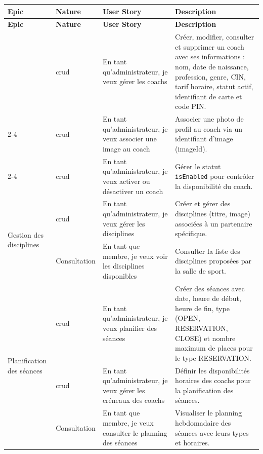 ﻿\documentclass[../main.tex]{subfiles}
\begin{document}
\begin{longtable}{|p{2.5cm}|p{2cm}|p{4cm}|p{5.5cm}|}
\hline
\textbf{Epic} & \textbf{Nature} & \textbf{User Story} & \textbf{Description} \\
\hline
\endfirsthead
\hline
\textbf{Epic} & \textbf{Nature} & \textbf{User Story} & \textbf{Description} \\
\hline
\endhead
\hline
\endfoot

\multirow{3}{*}{\parbox{2.5cm}{Gestion des coachs}} & \acrshort{crud} & En tant qu'administrateur, je veux g\'{e}rer les coachs & Cr\'{e}er, modifier, consulter et supprimer un coach avec ses informations : nom, date de naissance, profession, genre, CIN, tarif horaire, statut actif, identifiant de carte et code PIN. \\
\cline{2-4}
 & \acrshort{crud} & En tant qu'administrateur, je veux associer une image au coach & Associer une photo de profil au coach via un identifiant d'image (imageId). \\
\cline{2-4}
 & \acrshort{crud} & En tant qu'administrateur, je veux activer ou d\'{e}sactiver un coach & G\'{e}rer le statut \texttt{isEnabled} pour contr\^{o}ler la disponibilit\'{e} du coach. \\
\hline

\multirow{2}{*}{\parbox{2.5cm}{Gestion des disciplines}} & \acrshort{crud} & En tant qu'administrateur, je veux g\'{e}rer les disciplines & Cr\'{e}er et g\'{e}rer des disciplines (titre, image) associ\'{e}es \`{a} un partenaire sp\'{e}cifique. \\
\cline{2-4}
 & Consultation & En tant que membre, je veux voir les disciplines disponibles & Consulter la liste des disciplines propos\'{e}es par la salle de sport. \\
\hline

\multirow{3}{*}{\parbox{2.5cm}{Planification des s\'{e}ances}} & \acrshort{crud} & En tant qu'administrateur, je veux planifier des s\'{e}ances & Cr\'{e}er des s\'{e}ances avec date, heure de d\'{e}but, heure de fin, type (OPEN, RESERVATION, CLOSE) et nombre maximum de places pour le type RESERVATION. \\
\cline{2-4}
 & \acrshort{crud} & En tant qu'administrateur, je veux g\'{e}rer les cr\'{e}neaux des coachs & D\'{e}finir les disponibilit\'{e}s horaires des coachs pour la planification des s\'{e}ances. \\
\cline{2-4}
 & Consultation & En tant que membre, je veux consulter le planning des s\'{e}ances & Visualiser le planning hebdomadaire des s\'{e}ances avec leurs types et horaires. \\
\hline


\end{longtable}
\end{document}
